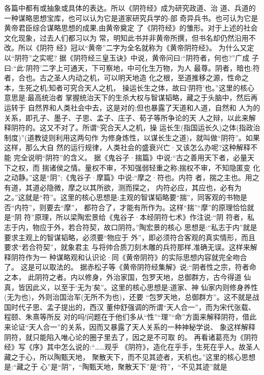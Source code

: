 \documentclass[12pt,UTF8]{ctexbook}
\begin{document}
各篇中都有或抽象或具体的表达。所以《阴符经》成为研究政道、治
道、兵道的一种谋略思想宝库，也可以认为它是道家研究兵学的-部
奇异兵书。也可认为它是黄帝君臣综合谋略思想的成果,由黄帝奠定
了《阴符经》的雏形。对于上述的社会文化现象，过去人们都习以为
常，明知此书并非黄帝所撰，但书名却仍然沿用不改。所以《阴符
经》冠以“黄帝”二字为全名就称为《黄帝阴符经》。
为什么又定以“阴符”之实呢?
据《阴符经三皇玉诀》中说，黄帝问曰:“阴符者，何也?”广成
子曰:“此‘阴符’二字上可通天，下可察地，中可化生万物，为人
最尊。阴者，暗也;符者，合也。古之圣人内动之机，可以明天地造
化之根，至道推移之源，性命之本，生死之机;知者可究合天人之机，
操运长生之体，故曰‘阴符’也。”这里的核心意思是:最高统治者
掌握统治天下的生杀大权与智谋韬略，藏之于头脑中，然后再运转于
自然界和人类社会中去，这是对的;但也暴露了天道和人道，自然和
人为的关系，即孔子、墨子、子思、孟子、庄子、荀子等所争论的天
人之辩，以此来解释阴符的。这又不对了。所谓“究合天人之机，操
运长生(指国运长久)之体(指政治制度)”(道教徒则利用这两句作
为修身炼性，以谋长生之道)，就叫做“阴符”。如果这样，那么大自
然的运行规律，人类社会的盛衰兴亡·又该怎么办呢?这种解释不能
完全说明“阴符”的含义。
据《鬼谷子·揣篇》中说:“古之善用天下者，必量天下之权，而
揣诸侯之情。量权不审，不知强弱轻重之称;揣权不审，不知隐匿变
化之动静。”这是“阴”;《鬼谷子·摩篇》中说:“摩之·符也。内符
者，揣之主也。用之有道，其道必隐微，摩之以其所欲，测而探之，
内符必应，其应也，必有为之。”这就是“符”。这里的核心思想是:主观的智谋韬略要“揣”，同客观的书物是否“内符”，则要去“摩”，
都符合了，才能有所作为。这样“揣”“摩”的原理恰恰就是“阴
符”原理，所以梁陶宏景给《鬼谷子·本经阴符七术》作注说:“阴
符者，私志于内，物应于外，若合符契，故口阴符。”陶宏景的核心
思想是:“私志于内”就是要求主观上的智谋韬略，必须要“物应于
外”，即必须符合客观的真实情形，而且要求“若合符契”，就象君主
与将帅合质刀刻木雕的兵符那样,准确无误。这样来解释阴符作为一
种谋略观和认识论·同《黄帝阴符》的实际思想内容就完全吻合了。
这是可以取法的。
据赤松子等《黄帝阴符经集解》说:“阴者性之宗，符者命之本，
此阴符之者。内以修身，外治家国，包罗天地，总御群方，古今得道
仙真，皆因此义，以至于‘无为’矣”。这里的核心思想是:道家、神
仙家内则修身养性(无为也)，外则治国治军(无所不为也)，还要
“包罗天地，总御群方”。这不就是战国时代子思、孟子提出的，西汉
董仲舒强调的所谓“天人合一”，而为宋代张载、程颐、朱熹等所反
对的吗!问题在于他们多从“性”“理”“命”方面来解释阴符，借此
来论证“天人合一”的关系，因而又暴露了天人关系的一种神秘学说、
象这样解释阴符，就只能陷入唯心论的圈子里去了，因之是不可取
的。
再看诸葛亮为《阴符经》写《序》其中怎么说的:“……观乎
《阴符》，造化在乎手，生死在乎人。故圣人藏之于心，所以陶甄天地，
聚散天下，而不见其迹者，天机也。”这里的核心思想是:“藏之于
心”是“阴”，“陶甄天地，聚散天下”是“符”，“不见其迹”就是
\end{document}
